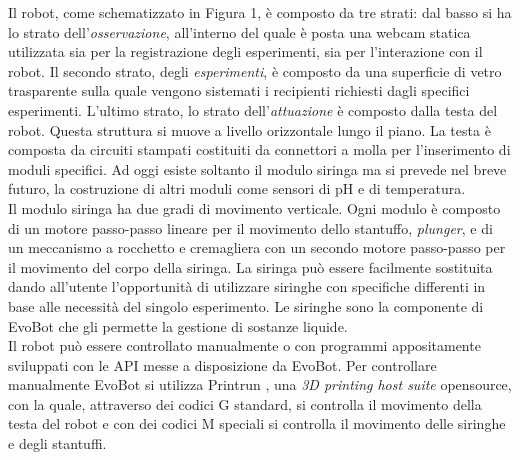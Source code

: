 Il robot, come schematizzato in Figura 1, è composto da tre strati: dal basso si ha lo strato dell'\emph{osservazione}, all'interno del quale è posta una webcam statica utilizzata sia per la registrazione degli esperimenti, sia per l'interazione con il robot. Il secondo strato, degli \emph{esperimenti}, è composto da una superficie di vetro trasparente sulla quale vengono sistemati i recipienti richiesti dagli specifici esperimenti. L'ultimo strato, lo strato dell'\emph{attuazione} è composto dalla testa del robot. Questa struttura si muove a livello orizzontale lungo il piano. La testa è composta da circuiti stampati costituiti da connettori a molla per l'inserimento di moduli specifici. Ad oggi esiste soltanto il modulo siringa ma si prevede nel breve futuro, la costruzione di altri moduli come sensori di pH e di temperatura. 
\\Il modulo siringa ha due gradi di movimento verticale. Ogni modulo è composto di un motore passo-passo lineare per il movimento dello stantuffo, \emph{plunger}, e di un meccanismo a rocchetto e cremagliera con un secondo motore passo-passo per il movimento del corpo della siringa. La siringa può essere facilmente sostituita dando all'utente l'opportunità di utilizzare siringhe con specifiche differenti in base alle necessità del singolo esperimento. Le siringhe sono la componente di EvoBot che gli permette la gestione di sostanze liquide. 
\\Il robot può essere controllato manualmente o con programmi appositamente sviluppati con le API messe a disposizione da EvoBot. Per controllare manualmente EvoBot si utilizza Printrun \cite{printrun}, una \emph{3D printing host suite}  opensource, con la quale, attraverso dei codici G standard, si controlla il movimento della testa del robot e con dei codici M speciali si controlla il movimento delle siringhe e degli stantuffi.

